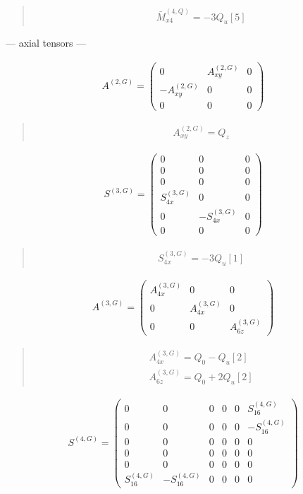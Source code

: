 \documentclass[fleqn,10pt]{jsarticle}
\begin{document}
\begin{quote}
\begin{align*}
& \bar{M}^{(4,Q)}_{x4} = - 3 Q_{u}[5]
\end{align*}
\end{quote}
\newpage
\begin{center}\LARGE --- axial tensors ---\end{center}
\begin{align*}
A^{(2,G)} = \begin{pmatrix} 0 & A^{(2,G)}_{xy} & 0 \\ - A^{(2,G)}_{xy} & 0 & 0 \\ 0 & 0 & 0 \end{pmatrix}
\end{align*}
\begin{quote}
\begin{align*}
& A^{(2,G)}_{xy} = Q_{z}
\end{align*}
\end{quote}
\begin{align*}
S^{(3,G)} = \begin{pmatrix} 0 & 0 & 0 \\ 0 & 0 & 0 \\ 0 & 0 & 0 \\ S^{(3,G)}_{4x} & 0 & 0 \\ 0 & - S^{(3,G)}_{4x} & 0 \\ 0 & 0 & 0 \end{pmatrix}
\end{align*}
\begin{quote}
\begin{align*}
& S^{(3,G)}_{4x} = - 3 Q_{u}[1]
\end{align*}
\end{quote}
\begin{align*}
A^{(3,G)} = \begin{pmatrix} A^{(3,G)}_{4x} & 0 & 0 \\ 0 & A^{(3,G)}_{4x} & 0 \\ 0 & 0 & A^{(3,G)}_{6z} \end{pmatrix}
\end{align*}
\begin{quote}
\begin{align*}
& A^{(3,G)}_{4x} = Q_{0} - Q_{u}[2] \\
& A^{(3,G)}_{6z} = Q_{0} + 2 Q_{u}[2]
\end{align*}
\end{quote}
\begin{align*}
S^{(4,G)} = \begin{pmatrix} 0 & 0 & 0 & 0 & 0 & S^{(4,G)}_{16} \\ 0 & 0 & 0 & 0 & 0 & - S^{(4,G)}_{16} \\ 0 & 0 & 0 & 0 & 0 & 0 \\ 0 & 0 & 0 & 0 & 0 & 0 \\ 0 & 0 & 0 & 0 & 0 & 0 \\ S^{(4,G)}_{16} & - S^{(4,G)}_{16} & 0 & 0 & 0 & 0 \end{pmatrix}
\end{align*}
\end{document}
